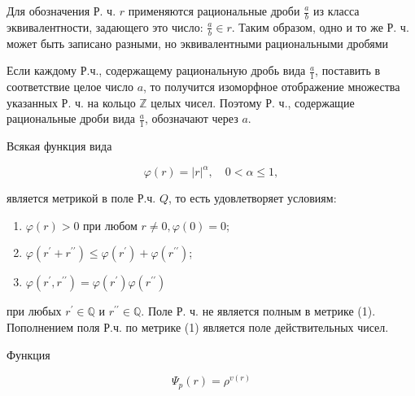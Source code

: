 \documentclass[10pt]{article}
\begin{document}
Для обозначения Р. ч. $r$ применяются рациональные дроби $\frac{a}{b}$ из класса эквивалентности, задающего это число: $\frac{a}{b} \in r$. Таким образом, одно и то же Р. ч. может быть записано разными, но эквивалентными рациональными дробями



Если каждому Р.ч., содержащему рациональную дробь вида $\frac{a}{1}$, поставить в соответствие целое число $a$, то получится изоморфное отображение множества указанных Р. ч. на кольцо $\mathbb{Z}$ целых чисел. Поэтому Р. ч., содержащие рациональные дроби вида $\frac{a}{1}$, обозначают через $a$.



Всякая функция вида



\[

\varphi(r)=|r|^{\alpha}, \quad 0<\alpha \leqslant 1,

\]



является метрикой в поле Р.ч. $Q$, то есть удовлетворяет условиям:



\begin{enumerate}

  \item $\varphi(r)>0$ при любом $r \neq 0, \varphi(0)=0$;



  \item $\varphi\left(r^{\prime}+r^{\prime \prime}\right) \leqslant \varphi\left(r^{\prime}\right)+\varphi\left(r^{\prime \prime}\right)$;



  \item $\varphi\left(r^{\prime}, r^{\prime \prime}\right)=\varphi\left(r^{\prime}\right) \varphi\left(r^{\prime \prime}\right)$



\end{enumerate}



при любых $r^{\prime} \in \mathbb{Q}$ и $r^{\prime \prime} \in \mathbb{Q}$. Поле Р. ч. не является полным в метрике (1). Пополнением поля Р.ч. по метрике (1) является поле действительных чисел.



Функция



\[

\Psi_{p}(r)=\rho^{v(r)}

\]
\end{document}
